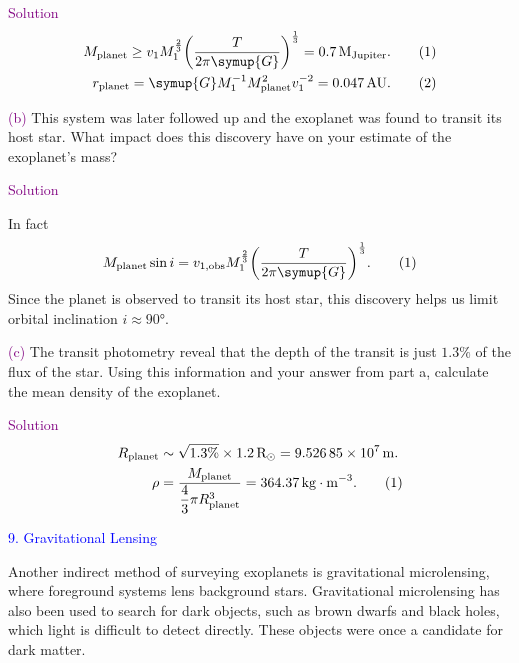 \documentclass[UTF8, 12pt, a4paper, oneside, twocolumn, fontset=none]{ctexart}
\begin{document}
\hspace*{\fill}

\noindent\textcolor{purple}{Solution}
\begin{align}
M_{\mathrm{planet}}\ge{}v_{1}M_{1}^{\frac{2}{3}}\mleft(\frac{T}{2\pi\symup{G}}\mright)^{\frac{1}{3}}=\qty{0.7}{M_{\mathrm{Jupiter}}}.\tag{1}\\
r_{\mathrm{planet}}=\symup{G}M_{1}^{-1}M_{\mathrm{planet}}^{2}v_{1}^{-2}=\qty{0.047}{AU}.\tag{2}
\end{align}

\hspace*{\fill}

\noindent\textcolor{purple}{(b)} This system was later followed up and the exoplanet was found to transit its host star. What impact does this discovery have on your estimate of the exoplanet's mass?

\hspace*{\fill}

\noindent\textcolor{purple}{Solution}

In fact
\begin{equation}
M_{\mathrm{planet}}\sin{i}=v_{1,\mathrm{obs}}M_{1}^{\frac{2}{3}}\mleft(\frac{T}{2\pi \symup{G}}\mright)^{\frac{1}{3}}.\tag{1}
\end{equation}
Since the planet is observed to transit its host star, this discovery helps us limit orbital inclination $i\approx\ang{90;;}$.

\hspace*{\fill}

\noindent\textcolor{purple}{(c)} The transit photometry reveal that the depth of the transit is just $1.3\%$ of the flux of the star. Using this information and your answer from part a, calculate the mean density of the exoplanet.

\hspace*{\fill}

\noindent\textcolor{purple}{Solution}
\begin{align}
R_{\mathrm{planet}}&\sim\sqrt{1.3\%}\times\qty{1.2}{R_{\odot}}=\qty{9.52685e7}{m}.\notag\\
\rho&=\frac{M_{\mathrm{planet}}}{\dfrac{4}{3}\pi{}R_{\mathrm{planet}}^{3}}=\qty{364.37}{kg\cdot{}m^{-3}}.\tag{1}
\end{align}

\hspace*{\fill}

\noindent\textcolor{blue}{9. Gravitational Lensing}

\noindent Another indirect method of surveying exoplanets is gravitational microlensing, where foreground systems lens background stars. Gravitational microlensing has also been used to search for dark objects, such as brown dwarfs and black holes, which light is difficult to detect directly. These objects were once a candidate for dark matter.
\end{document}
